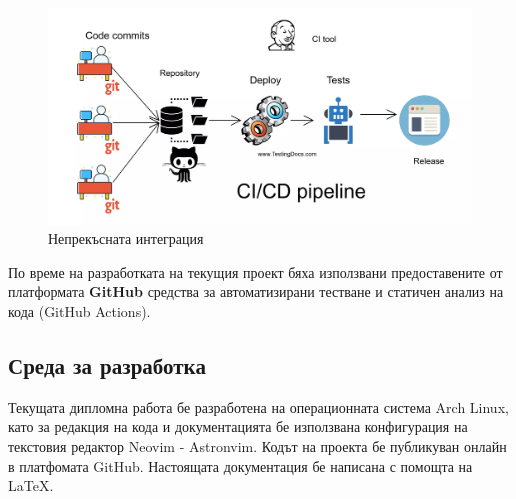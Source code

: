                \begin{figure}[h]
                        \centering
                        \includegraphics[width=1\textwidth]{images/ci-cd.png}
                        \caption{Непрекъсната интеграция}
                        \label{fig:ci-cd}
                \end{figure}

                По време на разработката на текущия проект бяха използвани 
                предоставените от платформата \textbf{GitHub} средства за 
                автоматизирани тестване и статичен анализ на кода (GitHub 
                Actions).

        \subsection{Среда за разработка}

                Текущата дипломна работа бе разработена на операционната
                система Arch Linux, като за редакция на кода и документацията 
                бе използвана конфигурация на текстовия редактор Neovim - 
                Astronvim. Кодът на проекта бе публикуван онлайн в платфомата 
                GitHub. Настоящата документация бе написана с помощта на 
                \LaTeX.

